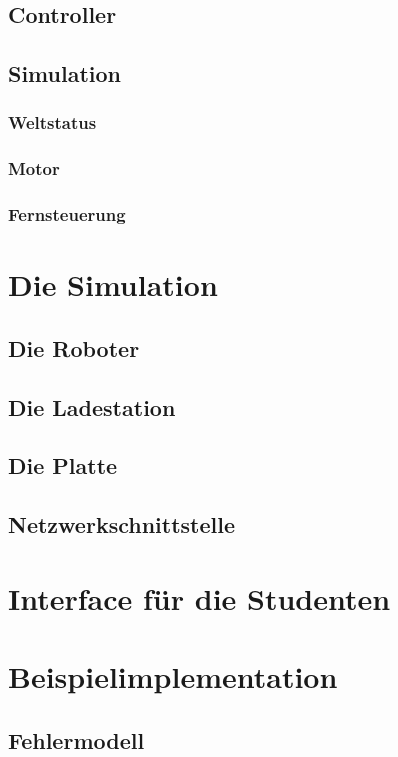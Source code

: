 \documentclass[ngerman]{scrartcl}
\begin{document}
\subsection{Controller}
\subsection{Simulation}
\subsubsection{Weltstatus}
\subsubsection{Motor}
\subsubsection{Fernsteuerung}
\section{Die Simulation} %
\subsection{Die Roboter}\label{robot}
\subsection{Die Ladestation}\label{fuelstation}
\subsection{Die Platte}\label{plate}
\subsection{Netzwerkschnittstelle}
\section{Interface f{\"{u}}r die Studenten}\label{interface}%
\section{Beispielimplementation}
\subsection{Fehlermodell} \label{error-model}
\end{document}
